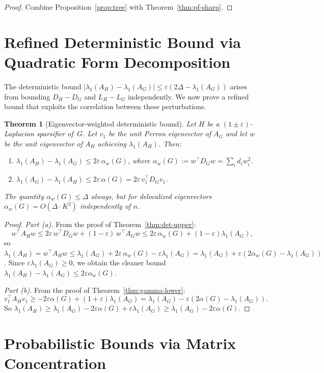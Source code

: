 \documentclass[11pt]{article}
\newtheorem{theorem}{Theorem}[section]
\theoremstyle{definition}
\newcommand{\eps}{\varepsilon}
\newcommand{\lamH}{\lambda_1(A_H)}
\newcommand{\lamG}{\lambda_1(A_G)}
\newcommand{\AG}{A_G}
\newcommand{\AH}{A_H}
\newcommand{\vone}{v_1}
\begin{document}
\begin{proof}
Combine Proposition~\ref{prop:tree} with Theorem~\ref{thm:pf-sharp}.
\end{proof}


\section{Refined Deterministic Bound via Quadratic Form Decomposition}%
\label{sec:refined-det}

The deterministic bound $|\lamH - \lamG| \leq \eps(2\Delta - \lamG)$ arises from
bounding $D_H - D_G$ and $L_H - L_G$ independently. We now prove a refined bound
that exploits the correlation between these perturbations.

\begin{theorem}[Eigenvector-weighted deterministic bound]\label{thm:refined-det}
Let $H$ be a $(1\pm\eps)$-Laplacian sparsifier of~$G$. Let $\vone$ be the unit Perron
eigenvector of $\AG$ and let $w$ be the unit eigenvector of $\AH$ achieving $\lamH$.
Then:
\begin{enumerate}[label=(\alph*),nosep]
\item $\lamH - \lamG \leq 2\eps\,\alpha_w(G)$,
where $\alpha_w(G) := w^\top D_G w = \sum_i d_i w_i^2$.
\item $\lamG - \lamH \leq 2\eps\,\alpha(G) = 2\eps\,\vone^\top D_G\vone$.
\end{enumerate}
The quantity $\alpha_w(G) \leq \Delta$ always, but for delocalized eigenvectors
$\alpha_w(G) = O(\Delta \cdot K^2)$ independently of $n$.
\end{theorem}

\begin{proof}
\emph{Part (a).} From the proof of Theorem~\ref{thm:det-upper}:
\[
w^\top \AH w \leq 2\eps\,w^\top D_G w + (1-\eps)\,w^\top \AG w
\leq 2\eps\,\alpha_w(G) + (1-\eps)\lamG,
\]
so $\lamH = w^\top \AH w \leq \lamG + 2\eps\,\alpha_w(G) - \eps\lamG
= \lamG + \eps(2\alpha_w(G) - \lamG)$.
Since $\eps\lamG \geq 0$, we obtain the cleaner bound
$\lamH - \lamG \leq 2\eps\alpha_w(G)$.

\emph{Part (b).} From the proof of Theorem~\ref{thm:gamma-lower}:
\[
\vone^\top \AH \vone \geq -2\eps\alpha(G) + (1+\eps)\lamG
= \lamG - \eps(2\alpha(G) - \lamG).
\]
So $\lamH \geq \lamG - 2\eps\alpha(G) + \eps\lamG \geq \lamG - 2\eps\alpha(G)$.
\end{proof}


\section{Probabilistic Bounds via Matrix Concentration}\label{sec:bernstein}
\end{document}
